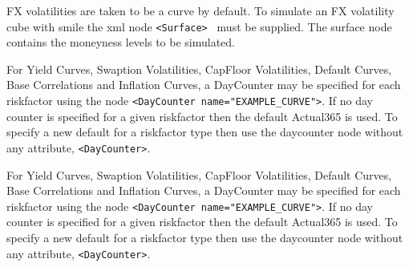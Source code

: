 \documentclass[12pt, a4paper]{article}
\begin{document}
FX volatilities are taken to be a curve by default. To simulate an FX volatility cube with smile the xml node {\tt <Surface> } must be supplied. The surface node contains the moneyness levels to be simulated.

For Yield Curves, Swaption Volatilities, CapFloor Volatilities, Default Curves, Base Correlations and Inflation Curves, a DayCounter may be specified for each riskfactor using the node {\tt <DayCounter name="EXAMPLE\_CURVE">}.  
If no day counter is specified for a given riskfactor then the default Actual365 is used. To specify a new default for a riskfactor type then use the daycounter node without any attribute,  {\tt <DayCounter>}. 

For Yield Curves, Swaption Volatilities, CapFloor Volatilities, Default Curves, Base Correlations and Inflation Curves, a DayCounter may be specified for each riskfactor using the node {\tt <DayCounter name="EXAMPLE\_CURVE">}. 
If no day counter is specified for a given riskfactor then the default Actual365 is used. To specify a new default for a riskfactor type then use the daycounter node without any attribute,  {\tt <DayCounter>}.
\end{document}
